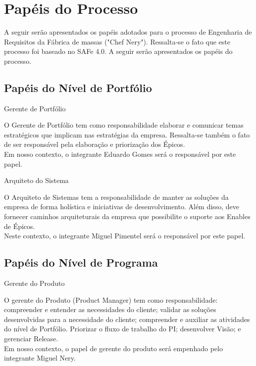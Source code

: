 {
	\large{\section {Papéis do Processo} }

	\tab A seguir serão apresentados os papéis adotados para o processo de Engenharia de Requisitos da Fábrica de massas ("Chef Nery"). Ressalta-se o fato que este processo foi baseado no SAFe 4.0. A seguir serão apresentados os papéis do processo.\\

}


{\large{\subsection {Papéis do Nível de Portfólio} } }
\begin{itemize}
{
	\large{\item {Gerente de Portfólio\\} }

	\tab O Gerente de Portfólio tem como responsabilidade elaborar e comunicar temas estratégicos que implicam nas estratégias da empresa. Ressalta-se também o fato de ser responsável pela elaboração e priorização dos Épicos. \\
	\tab Em nosso contexto, o integrante Eduardo Gomes será o responsável por este papel. \\
}


{
	\large{\item {Arquiteto do Sistema\\} }

	\tab O Arquiteto de Sistemas tem a responsabilidade de manter as soluções da empresa de forma holística e iniciativas de desenvolvimento. Além disso, deve fornecer caminhos arquiteturais da empresa que possibilite o suporte aos Enables de Épicos. \\
	\tab Neste contexto, o integrante Miguel Pimentel será o responsável por este papel. \\
}

{\large{\subsection {Papéis do Nível de Programa} } }

{
	\large{\item {Gerente do Produto\\} }

	\tab O gerente do Produto (Product Manager)  tem como responsabilidade: compreender e entender as necessidades do cliente; validar as soluções desenvolvidas para a necessidade do cliente;  compreender e auxiliar as atividades do nível de Portfólio. Priorizar o fluxo de trabalho do PI; desenvolver Visão; e gerenciar Release. \\
	\tab Em nosso contexto, o papel de gerente do produto será empenhado pelo integrante Miguel Nery. \\
 }


\end{itemize}
